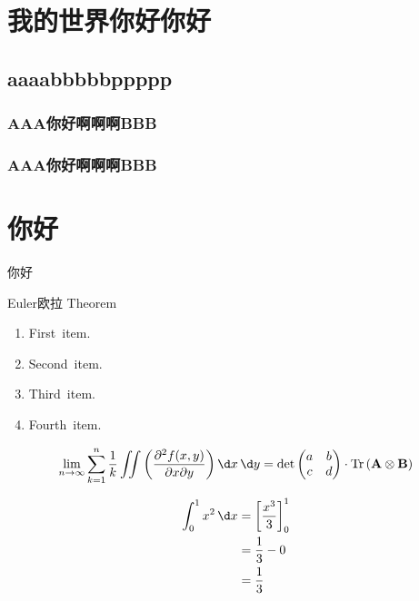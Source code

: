 \documentclass[10pt]{atombook}
\begin{document}
\chapter{我的世界你好你好}
\section{aaaabbbbbppppp}
\zhlipsum*[1]

\subsection{AAA你好啊啊啊BBB}
\zhlipsum*[2]

\subsection{AAA你好啊啊啊BBB}
\zhlipsum*[1-3]


\chapter{你好}
你好
\zhlipsum*[1]
\begin{mybox}[colframe=cyan]{Euler欧拉 Theorem}
    \begin{enumerate}
        \item First~item.
        \item Second~item.
        \item Third~item.
        \item Fourth~item.
    \end{enumerate}
    \zhlipsum*[3]
\end{mybox}

\[ 
\lim_{n \to \infty} \sum_{k=1}^{n} \frac{1}{k} \iint
\left( \frac{\partial^{2} f(x,y)}{\partial x \partial y} \right) \d x \, \d y 
= \det \begin{pmatrix} a & b \\ c & d \end{pmatrix} 
\cdot \operatorname{Tr} \left( \mathbf{A} \otimes \mathbf{B} \right)
\]

\zhlipsum*[1]
\begin{align}
\int_{0}^{1} x^{2} \, \d x 
&= \left[ \frac{x^{3}}{3} \right]_{0}^{1} \\
&= \frac{1}{3} - 0 \\
&= \frac{1}{3}
\end{align}

\zhlipsum*[name=zhufu]
\end{document}
